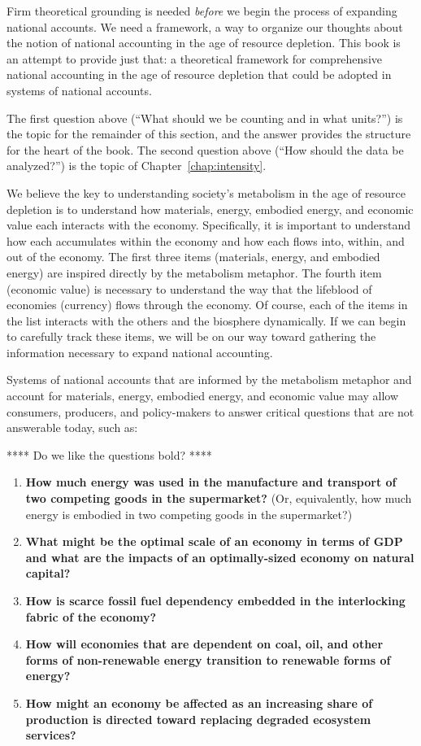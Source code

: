 Firm theoretical grounding is needed 
\emph{before} we begin the process of expanding national accounts.
We need a framework, a way to organize our thoughts about the notion 
of national accounting in the age of resource depletion.
This book is an attempt to provide just that: 
a theoretical framework
for comprehensive national accounting
in the age of resource depletion
that could be adopted in systems of national accounts.

The first question above (``What should we be counting and in what units?'') 
is the topic for the remainder of this section,
and the answer provides the structure for the heart of the book.
The second question above (``How should the data be analyzed?'')
is the topic of Chapter~\ref{chap:intensity}.

We believe the key to understanding society's metabolism
in the age of resource depletion is to understand how 
materials, energy, embodied energy, and economic value
each interacts with the economy.
Specifically, it is important to understand how each
accumulates within the economy and how each flows into, within, and out of the economy.
The first three items (materials, energy, and embodied energy) are
inspired directly by the metabolism metaphor.
The fourth item (economic value) is necessary to understand the way 
that the lifeblood of economies (currency) flows through the economy.
Of course, each of the items in the list interacts with the others 
and the biosphere dynamically.
If we can begin to carefully track these items, 
we will be on our way toward gathering the information necessary to 
expand national accounting.

Systems of national accounts that are informed by the metabolism metaphor 
and account for materials, energy, embodied energy, and economic value
may allow consumers, producers,
and policy-makers to answer critical questions that are not
answerable today, such as:

**** Do we like the questions bold? ****

\begin{enumerate}
	\item{\textbf{How much energy was used in the manufacture and transport
				of two competing goods in the supermarket?} 
				(Or, equivalently, how much energy is embodied 
				in two competing goods in the supermarket?)}
	\item{\textbf{What might be the optimal scale of an economy in terms of GDP 
				and what are the impacts of an optimally-sized economy on natural capital?}}
    \item{\textbf{How is scarce fossil fuel dependency embedded 
    			in the interlocking fabric of the economy?}} 
    \item{\textbf{How will economies that are dependent on coal, oil, 
     			and other forms of non-renewable energy transition 
    			to renewable forms of energy?}}
	\item{\textbf{How might an economy be affected as an increasing share of production
				is directed toward replacing 
				degraded ecosystem services?}~\cite[p.~221]{kummel2011}​}
\end{enumerate}

